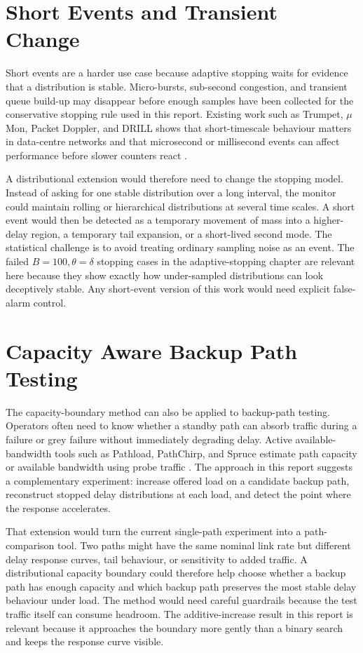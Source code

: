 \documentclass[a4paper,11pt]{report}
\begin{document}
\section{Short Events and Transient Change}

Short events are a harder use case because adaptive stopping waits for evidence that a distribution is stable. Micro-bursts, sub-second congestion, and transient queue build-up may disappear before enough samples have been collected for the conservative stopping rule used in this report. Existing work such as Trumpet, \(\mu\)Mon, Packet Doppler, and DRILL shows that short-timescale behaviour matters in data-centre networks and that microsecond or millisecond events can affect performance before slower counters react \cite{moshrefTrumpet,zhengMuMon,qiuPacketDoppler,ghorbaniDrill}.

A distributional extension would therefore need to change the stopping model. Instead of asking for one stable distribution over a long interval, the monitor could maintain rolling or hierarchical distributions at several time scales. A short event would then be detected as a temporary movement of mass into a higher-delay region, a temporary tail expansion, or a short-lived second mode. The statistical challenge is to avoid treating ordinary sampling noise as an event. The failed \(B=100,\theta=\delta\) stopping cases in the adaptive-stopping chapter are relevant here because they show exactly how under-sampled distributions can look deceptively stable. Any short-event version of this work would need explicit false-alarm control.

\section{Capacity Aware Backup Path Testing}

The capacity-boundary method can also be applied to backup-path testing. Operators often need to know whether a standby path can absorb traffic during a failure or grey failure without immediately degrading delay. Active available-bandwidth tools such as Pathload, PathChirp, and Spruce estimate path capacity or available bandwidth using probe traffic \cite{jainDovrolisPathload,ribeiroPathchirp,straussSpruce}. The approach in this report suggests a complementary experiment: increase offered load on a candidate backup path, reconstruct stopped delay distributions at each load, and detect the point where the response accelerates.

That extension would turn the current single-path experiment into a path-comparison tool. Two paths might have the same nominal link rate but different delay response curves, tail behaviour, or sensitivity to added traffic. A distributional capacity boundary could therefore help choose whether a backup path has enough capacity and which backup path preserves the most stable delay behaviour under load. The method would need careful guardrails because the test traffic itself can consume headroom. The additive-increase result in this report is relevant because it approaches the boundary more gently than a binary search and keeps the response curve visible.
\end{document}
